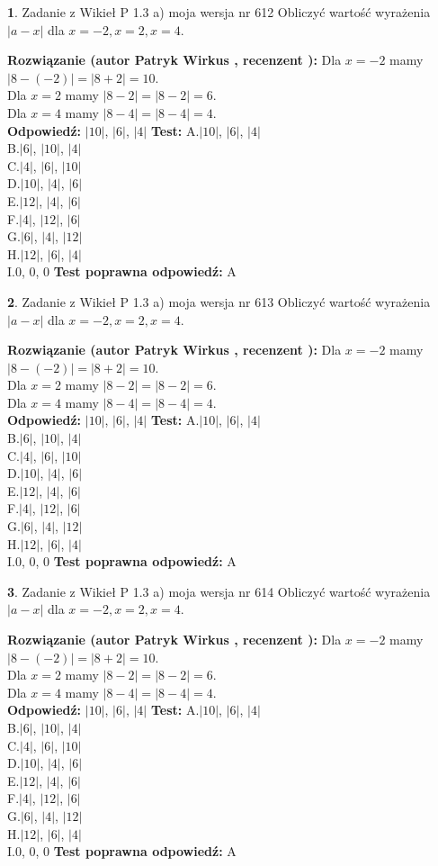 \documentclass[12pt, a4paper]{article}
\theoremstyle{definition} %
\newtheorem{zad}{}
\newcommand{\zadStart}[1]{\begin{zad}#1\newline}
\newcommand{\zadStop}{\end{zad}}
\newcommand{\rozwStart}[2]{\noindent \textbf{Rozwiązanie (autor #1 , recenzent #2): }\newline}
\newcommand{\rozwStop}{\newline}
\newcommand{\odpStart}{\noindent \textbf{Odpowiedź:}\newline}
\newcommand{\odpStop}{\newline}
\newcommand{\testStart}{\noindent \textbf{Test:}\newline}
\newcommand{\testStop}{\newline}
\newcommand{\kluczStart}{\noindent \textbf{Test poprawna odpowiedź:}\newline}
\newcommand{\kluczStop}{\newline}
\begin{document}
\zadStart{Zadanie z Wikieł P 1.3 a) moja wersja nr 612}
Obliczyć wartość wyrażenia $|a - x|$ dla $x=-2,x=2,x=4$.
\zadStop
\rozwStart{Patryk Wirkus}{}
Dla $x = -2$ mamy $|8 - (-2)| = |8 + 2| = 10$.\\
Dla $x = 2$ mamy $|8 - 2| = |8 - 2| = 6$.\\
Dla $x = 4$ mamy $|8 - 4| = |8 - 4| = 4$.\\
\rozwStop
\odpStart
$|10|$, $|6|$, $|4|$
\odpStop
\testStart
A.$|10|$, $|6|$, $|4|$\\
B.$|6|$, $|10|$, $|4|$\\
C.$|4|$, $|6|$, $|10|$\\
D.$|10|$, $|4|$, $|6|$\\
E.$|12|$, $|4|$, $|6|$\\
F.$|4|$, $|12|$, $|6|$\\
G.$|6|$, $|4|$, $|12|$\\
H.$|12|$, $|6|$, $|4|$\\
I.$0$, $0$, $0$
\testStop
\kluczStart
A
\kluczStop



\zadStart{Zadanie z Wikieł P 1.3 a) moja wersja nr 613}
Obliczyć wartość wyrażenia $|a - x|$ dla $x=-2,x=2,x=4$.
\zadStop
\rozwStart{Patryk Wirkus}{}
Dla $x = -2$ mamy $|8 - (-2)| = |8 + 2| = 10$.\\
Dla $x = 2$ mamy $|8 - 2| = |8 - 2| = 6$.\\
Dla $x = 4$ mamy $|8 - 4| = |8 - 4| = 4$.\\
\rozwStop
\odpStart
$|10|$, $|6|$, $|4|$
\odpStop
\testStart
A.$|10|$, $|6|$, $|4|$\\
B.$|6|$, $|10|$, $|4|$\\
C.$|4|$, $|6|$, $|10|$\\
D.$|10|$, $|4|$, $|6|$\\
E.$|12|$, $|4|$, $|6|$\\
F.$|4|$, $|12|$, $|6|$\\
G.$|6|$, $|4|$, $|12|$\\
H.$|12|$, $|6|$, $|4|$\\
I.$0$, $0$, $0$
\testStop
\kluczStart
A
\kluczStop



\zadStart{Zadanie z Wikieł P 1.3 a) moja wersja nr 614}
Obliczyć wartość wyrażenia $|a - x|$ dla $x=-2,x=2,x=4$.
\zadStop
\rozwStart{Patryk Wirkus}{}
Dla $x = -2$ mamy $|8 - (-2)| = |8 + 2| = 10$.\\
Dla $x = 2$ mamy $|8 - 2| = |8 - 2| = 6$.\\
Dla $x = 4$ mamy $|8 - 4| = |8 - 4| = 4$.\\
\rozwStop
\odpStart
$|10|$, $|6|$, $|4|$
\odpStop
\testStart
A.$|10|$, $|6|$, $|4|$\\
B.$|6|$, $|10|$, $|4|$\\
C.$|4|$, $|6|$, $|10|$\\
D.$|10|$, $|4|$, $|6|$\\
E.$|12|$, $|4|$, $|6|$\\
F.$|4|$, $|12|$, $|6|$\\
G.$|6|$, $|4|$, $|12|$\\
H.$|12|$, $|6|$, $|4|$\\
I.$0$, $0$, $0$
\testStop
\kluczStart
A
\kluczStop
\end{document}
